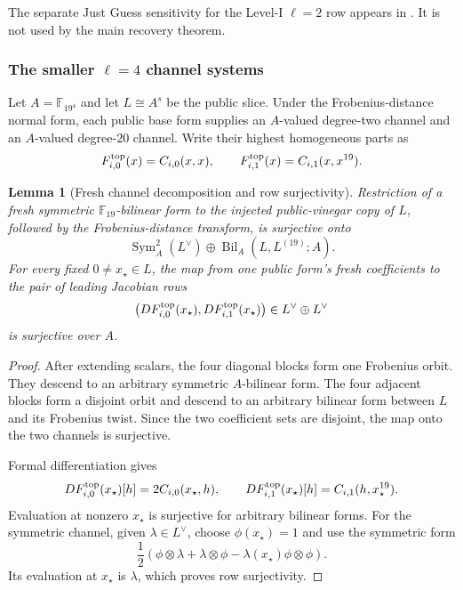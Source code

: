 \documentclass[11pt]{article}
\newtheorem{lemma}[theorem]{Lemma}
\newcommand{\F}{\mathbb F}
\begin{document}
The separate Just Guess sensitivity for the Level-I $\ell=2$ row appears in
.  It is not used by the main recovery theorem.

\subsubsection{The smaller \texorpdfstring{$\ell=4$}{ell=4} channel systems}

Let $A=\F_{19^4}$ and let $L\cong A^s$ be the public slice.  Under the
Frobenius-distance normal form, each public base form supplies an $A$-valued
degree-two channel and an $A$-valued degree-$20$ channel.  Write their highest
homogeneous parts as
\[
 F_{i,0}^{\rm top}(x)=C_{i,0}(x,x),\qquad
 F_{i,1}^{\rm top}(x)=C_{i,1}(x,x^{19}).
\]

\begin{lemma}[Fresh channel decomposition and row surjectivity]
\label{lem:sq-channel-surj}
Restriction of a fresh symmetric $\F_{19}$-bilinear form to the injected
public-vinegar copy of $L$, followed by the Frobenius-distance transform, is
surjective onto
\[
 \operatorname{Sym}_A^2(L^\vee)
 \oplus\operatorname{Bil}_A(L,L^{(19)};A).
\]
For every fixed $0\ne x_\star\in L$, the map from one public form's fresh
coefficients to the pair of leading Jacobian rows
\[
 \bigl(DF_{i,0}^{\rm top}(x_\star),
       DF_{i,1}^{\rm top}(x_\star)\bigr)
 \in L^\vee\oplus L^\vee
\]
is surjective over $A$.
\end{lemma}

\begin{proof}
After extending scalars, the four diagonal blocks form one Frobenius orbit.
They descend to an arbitrary symmetric $A$-bilinear form.  The four adjacent
blocks form a disjoint orbit and descend to an arbitrary bilinear form between
$L$ and its Frobenius twist.  Since the two coefficient sets are disjoint, the
map onto the two channels is surjective.

Formal differentiation gives
\[
 DF_{i,0}^{\rm top}(x_\star)[h]=2C_{i,0}(x_\star,h),
 \qquad
 DF_{i,1}^{\rm top}(x_\star)[h]=C_{i,1}(h,x_\star^{19}).
\]
Evaluation at nonzero $x_\star$ is surjective for arbitrary bilinear forms.
For the symmetric channel, given $\lambda\in L^\vee$, choose
$\phi(x_\star)=1$ and use the symmetric form
\[
 \frac12(\phi\otimes\lambda+\lambda\otimes\phi
          -\lambda(x_\star)\phi\otimes\phi).
\]
Its evaluation at $x_\star$ is $\lambda$, which proves row surjectivity.
\end{proof}
\end{document}
